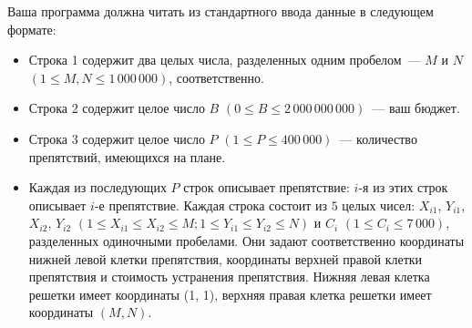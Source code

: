 Ваша программа должна читать из стандартного ввода данные в следующем формате:
\begin{itemize}
\item Строка 1 содержит два целых числа, разделенных одним пробелом~--- $M$ и $N$ $(1 \le M, N \le 1\,000\,000)$, соответственно.
\item Строка 2 содержит целое число $B$ $(0 \le B \le 2\,000\,000\,000)$~--- ваш бюджет.
\item Строка 3 содержит целое число $P$ $(1 \le P \le 400\,000)$~--- количество препятствий, имеющихся на плане.
\item Каждая из последующих $P$ строк описывает препятствие: $i$-я из этих строк описывает $i$-е препятствие. Каждая строка состоит из $5$ целых чисел: $X_{i1}$, $Y_{i1}$, $X_{i2}$, $Y_{i2}$ $(1 \le X_{i1} \le X_{i2} \le M; 1 \le Y_{i1} \le Y_{i2} \le N)$ и $C_i$ $(1 \le C_i \le 7\,000)$, разделенных одиночными пробелами. Они задают соответственно координаты нижней левой клетки препятствия, координаты верхней правой клетки препятствия и стоимость устранения препятствия. Нижняя левая клетка решетки имеет координаты (1, 1), верхняя правая клетка решетки имеет координаты $(M, N)$.
\end{itemize}